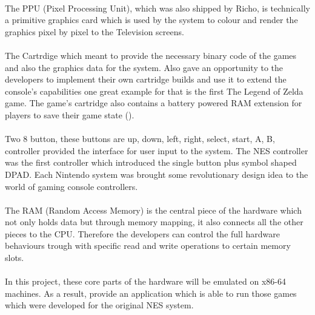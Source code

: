 \documentclass[]{report}
\begin{document}
\paragraph{ }
The PPU (Pixel Processing Unit), which was also shipped by Richo, is technically a primitive graphics card which is used by the system to colour and render the graphics pixel by pixel to the Television screens.
\paragraph{ }
The Cartrdige which meant to provide the necessary binary code of the games and also the graphics data for the system. Also gave an opportunity to the developers to implement their own cartridge builds and use it to extend the console's capabilities one great example for that is the first The Legend of Zelda game. The game's cartridge also contains a battery powered RAM extension for players to save their game state (\cite{ZELD}).
\paragraph{ }
Two 8 button, these buttons are up, down, left, right, select, start, A, B, controller provided the interface for user input to the system. The NES controller was the first controller which introduced the single button plus symbol shaped DPAD. Each Nintendo system was brought some revolutionary design idea to the world of gaming console controllers.
\paragraph{ }
The RAM (Random Access Memory) is the central piece of the hardware which not only holds data but through memory mapping, it also connects all the other pieces to the CPU. Therefore the developers can control the full hardware behaviours trough with specific read and write operations to certain memory slots.
\paragraph{ }
In this project, these core parts of the hardware will be emulated on x86-64 machines. As a result, provide an application which is able to run those games which were developed for the original NES system.
\end{document}
